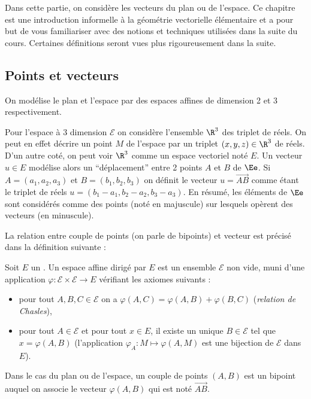 Dans cette partie, on considère les vecteurs du plan ou de l'espace. Ce chapitre est une introduction informelle à la géométrie vectorielle élémentaire et a pour but de vous familiariser avec des notions et techniques utilisées dans la suite du cours. Certaines définitions seront vues plus rigoureusement dans la suite.


\subsection{Points et vecteurs}

On modélise le plan et l'espace par des espaces affines de dimension 2 et 3 respectivement.

Pour l'espace à 3 dimension $\mathcal E$ on considère l'ensemble $\R^3$ des triplet de réels. On peut en effet décrire un point $M$ de l'espace par un triplet $(x,y,z)\in\R^3$ de réels. D'un autre coté, on peut voir $\R^3$ comme un espace vectoriel noté $E$. Un vecteur $u\in E$ modélise alors un ``déplacement'' entre 2 points $A$ et $B$ de $\Ee$. Si $A = (a_1,a_2,a_3)$ et $B=(b_1,b_2,b_3)$ on définit le vecteur $u = \overrightarrow{AB}$ comme étant le triplet de réels $u = (b_1-a_1,b_2-a_2,b_3-a_3)$. %
En résumé, les éléments de $\Ee$ sont considérés comme des points (noté en majuscule) sur lesquels opèrent des vecteurs (en minuscule).

La relation entre couple de points (on parle de bipoints) et vecteur est précisé dans la définition suivante :%
\begin{definition}
	Soit $E$ un \rev. Un espace affine dirigé par $E$ est un ensemble $\mathcal E$ non vide, muni d'une application $\varphi : \mathcal E \times \mathcal E \to E$ vérifiant les axiomes suivants :
	\begin{itemize}
		\item pour tout $A,B,C\in \mathcal E$ on a $\varphi(A,C) = \varphi(A,B) +  \varphi(B,C)$ (\emph{relation de Chasles}),
		\item pour tout $A \in \mathcal E$ et pour tout $x\in E$, il existe un unique $B \in \mathcal E$ tel que $x = \varphi(A,B)$ (\ie l'application $\varphi_A:M\mapsto\varphi(A,M)$ est une bijection de $\mathcal E$ dans $E$).
	\end{itemize}
\end{definition}
Dans le cas du plan ou de l'espace, un couple de points $(A,B)$ est un bipoint auquel on associe le vecteur $\varphi(A,B)$ qui est noté $\overrightarrow{AB}$.

